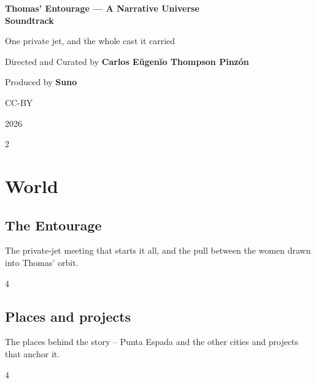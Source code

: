 \documentclass[a4paper,landscape]{memoir}
\begin{document}
\frontmatter
{}
\begin{titlingpage}
\centering
\vspace*{\fill}
{\LARGE\bfseries Thomas' Entourage --- A Narrative Universe\\\Huge Soundtrack\par}
\bigskip
{\large One private jet, and the whole cast it carried\par}
\vspace*{\fill}
{\normalsize Directed and Curated by \bfseries Carlos Eŭgenĭo Thompson Pinzón\par}
{\normalsize Produced by \bfseries Suno\par}
\bigskip
{\normalsize CC-BY\par}
{\normalsize 2026\par}
\vspace*{\fill}
\end{titlingpage}

\clearpage\begin{multicols*}{2}
\tableofcontents*
\end{multicols*}
\mainmatter
\renewcommand\chaptername{Album~}
\part{World}
\chapter{The Entourage}
The private-jet meeting that starts it all, and the pull between the women drawn into Thomas' orbit.
\clearpage\begin{multicols*}{4}




\end{multicols*}

\chapter{Places and projects}
The places behind the story -- Punta Espada and the other cities and projects that anchor it.
\clearpage\begin{multicols*}{4}










\end{multicols*}
\end{document}
